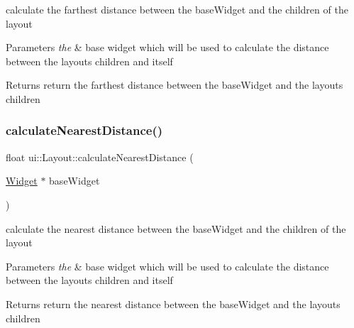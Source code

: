 calculate the farthest distance between the base\+Widget and the children of the layout 
\begin{DoxyParams}{Parameters}
{\em the} & base widget which will be used to calculate the distance between the layout\textquotesingle{}s children and itself \\
\hline
\end{DoxyParams}
\begin{DoxyReturn}{Returns}
return the farthest distance between the base\+Widget and the layout\textquotesingle{}s children 
\end{DoxyReturn}
\mbox{\label{classui_1_1Layout_a2f584f68c1cb52969140e28af913005b}} 
\subsubsection{\texorpdfstring{calculate\+Nearest\+Distance()}{calculateNearestDistance()}\hspace{0.1cm}{\footnotesize\ttfamily [1/2]}}
{\footnotesize\ttfamily float ui\+::\+Layout\+::calculate\+Nearest\+Distance (\begin{DoxyParamCaption}\item[{\hyperlink{classui_1_1Widget}{Widget} $\ast$}]{base\+Widget }\end{DoxyParamCaption})\hspace{0.3cm}{\ttfamily [protected]}}

calculate the nearest distance between the base\+Widget and the children of the layout 
\begin{DoxyParams}{Parameters}
{\em the} & base widget which will be used to calculate the distance between the layout\textquotesingle{}s children and itself \\
\hline
\end{DoxyParams}
\begin{DoxyReturn}{Returns}
return the nearest distance between the base\+Widget and the layout\textquotesingle{}s children 
\end{DoxyReturn}
\mbox{\label{classui_1_1Layout_a2f584f68c1cb52969140e28af913005b}} 
